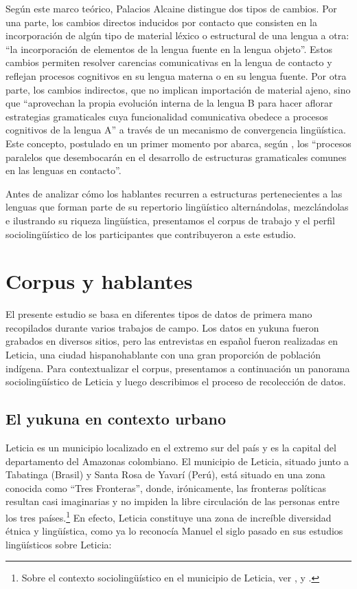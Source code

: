 \documentclass[output=paper]{langscibook}
\begin{document}
Según este marco teórico, Palacios Alcaine distingue dos tipos de cambios. Por una parte, los cambios directos inducidos por contacto que consisten en la incorporación de algún tipo de material léxico o estructural de una lengua a otra: “la incorporación de elementos de la lengua fuente en la lengua objeto”\citet[262]{PalaciosAlcaine2007compatibles}. Estos cambios permiten resolver carencias comunicativas en la lengua de contacto y reflejan procesos cognitivos en su lengua materna o en su lengua fuente. Por otra parte, los cambios indirectos, que no implican importación de material ajeno, sino que “aprovechan la propia evolución interna de la lengua B para hacer aflorar estrategias gramaticales cuya funcionalidad comunicativa obedece a procesos cognitivos de la lengua A” a través de un mecanismo de convergencia lingüística. Este concepto, postulado en un primer momento por  \citet{GumperzWilson1971} abarca, según \citet[263]{PalaciosAlcaine2007compatibles}, los “procesos paralelos que desembocarán en el desarrollo de estructuras gramaticales comunes en las lenguas en contacto”.

Antes de analizar cómo los hablantes recurren a estructuras pertenecientes a las lenguas que forman parte de su repertorio lingüístico alternándolas, mezclándolas e ilustrando su riqueza lingüística, presentamos el corpus de trabajo y el perfil sociolingüístico de los participantes que contribuyeron a este estudio.

\section{Corpus y hablantes}

El presente estudio se basa en diferentes tipos de datos de primera mano recopilados durante varios trabajos de campo. Los datos en yukuna fueron grabados en diversos sitios, pero las entrevistas en español fueron realizadas en Leticia, una ciudad hispanohablante con una gran proporción de población indígena. Para contextualizar el corpus, presentamos a continuación un panorama sociolingüístico de Leticia y luego describimos el proceso de recolección de datos.

\subsection{El yukuna en contexto urbano}

Leticia es un municipio localizado en el extremo sur del país y es la capital del departamento del Amazonas colombiano. El municipio de Leticia, situado junto a Tabatinga (Brasil) y Santa Rosa de Yavarí (Perú), está situado en una zona conocida como “Tres Fronteras”, donde, irónicamente, las fronteras políticas resultan casi imaginarias y no impiden la libre circulación de las personas entre los tres países.\footnote{Sobre el contexto sociolingüístico en el municipio de Leticia, ver  \citet{FaguaRincón2000},  \citet{DeCamposBarbosa2008} y  \citet{SánchezMoreano2019}.}  En efecto, Leticia constituye una zona de increíble diversidad étnica y lingüística, como ya lo reconocía Manuel \citet[32]{Alvar1977} el siglo pasado en sus estudios lingüísticos sobre  Leticia:
\end{document}
